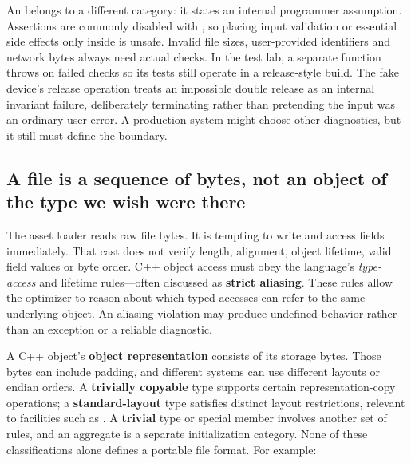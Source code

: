 An  belongs to a different category: it states an internal programmer assumption. Assertions are commonly disabled with , so placing input validation or essential side effects only inside  is unsafe. Invalid file sizes, user-provided identifiers and network bytes always need actual checks. In the test lab, a separate  function throws on failed checks so its tests still operate in a release-style  build. The fake device's release operation treats an impossible double release as an internal invariant failure, deliberately terminating rather than pretending the input was an ordinary user error. A production system might choose other diagnostics, but it still must define the boundary.

\subsection{A file is a sequence of bytes, not an object of the type we wish were there}\label{05-engine-i-ch004-a-file-is-a-sequence-of-bytes-not-an-object-of-the-type-we-wish-were-there}

\hypertarget{05-engine-i-ch004-a-file-is-a-sequence-of-bytes-not-an-object-of-the-type-we-wish-were-there}{}

The asset loader reads raw file bytes. It is tempting to write  and access fields immediately. That cast does not verify length, alignment, object lifetime, valid field values or byte order. C++ object access must obey the language's \emph{type-access} and lifetime rules---often discussed as \textbf{strict aliasing}. These rules allow the optimizer to reason about which typed accesses can refer to the same underlying object. An aliasing violation may produce undefined behavior rather than an exception or a reliable diagnostic.

A C++ object's \textbf{object representation} consists of its storage bytes. Those bytes can include padding, and different systems can use different layouts or endian orders. A \textbf{trivially copyable} type supports certain representation-copy operations; a \textbf{standard-layout} type satisfies distinct layout restrictions, relevant to facilities such as . A \textbf{trivial} type or special member involves another set of rules, and an aggregate is a separate initialization category. None of these classifications alone defines a portable file format. For example:

